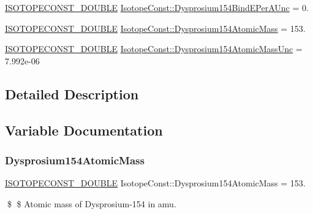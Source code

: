 \begin{DoxyCompactItemize}
\item 
\mbox{\hyperlink{group___isotope_const-_macros_ga8f45a7272ce02c0b4c65c44636ed719a}{I\+S\+O\+T\+O\+P\+E\+C\+O\+N\+S\+T\+\_\+\+D\+O\+U\+B\+LE}} \mbox{\hyperlink{group___isotope_const-_dysprosium-_dy154_gaaf73d619f51b29d109a9c8753cbb5f03}{Isotope\+Const\+::\+Dysprosium154\+Bind\+E\+Per\+A\+Unc}} = 0.
\item 
\mbox{\hyperlink{group___isotope_const-_macros_ga8f45a7272ce02c0b4c65c44636ed719a}{I\+S\+O\+T\+O\+P\+E\+C\+O\+N\+S\+T\+\_\+\+D\+O\+U\+B\+LE}} \mbox{\hyperlink{group___isotope_const-_dysprosium-_dy154_ga859954fcb24be17669d4cbab715349d2}{Isotope\+Const\+::\+Dysprosium154\+Atomic\+Mass}} = 153.
\item 
\mbox{\hyperlink{group___isotope_const-_macros_ga8f45a7272ce02c0b4c65c44636ed719a}{I\+S\+O\+T\+O\+P\+E\+C\+O\+N\+S\+T\+\_\+\+D\+O\+U\+B\+LE}} \mbox{\hyperlink{group___isotope_const-_dysprosium-_dy154_ga20d57671921b61a8926d90278ff152a4}{Isotope\+Const\+::\+Dysprosium154\+Atomic\+Mass\+Unc}} = 7.\+992e-\/06
\end{DoxyCompactItemize}


\subsection{Detailed Description}


\subsection{Variable Documentation}
\mbox{\label{group___isotope_const-_dysprosium-_dy154_ga859954fcb24be17669d4cbab715349d2}} 
\subsubsection{\texorpdfstring{Dysprosium154\+Atomic\+Mass}{Dysprosium154AtomicMass}}
{\footnotesize\ttfamily \mbox{\hyperlink{group___isotope_const-_macros_ga8f45a7272ce02c0b4c65c44636ed719a}{I\+S\+O\+T\+O\+P\+E\+C\+O\+N\+S\+T\+\_\+\+D\+O\+U\+B\+LE}} Isotope\+Const\+::\+Dysprosium154\+Atomic\+Mass = 153.}

\$ \$ Atomic mass of Dysprosium-\/154 in amu. \mbox{\label{group___isotope_const-_dysprosium-_dy154_ga20d57671921b61a8926d90278ff152a4}} 
